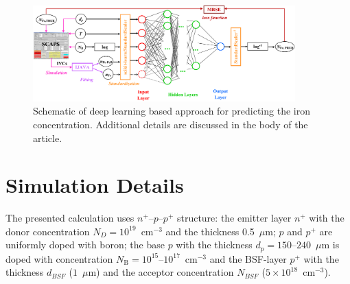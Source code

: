 \documentclass[a4paper,fleqn]{cas-sc}
\begin{document}
\begin{figure}
\centering
\includegraphics[width=0.9\textwidth]{Chem}
\caption{Schematic of deep learning based approach  for predicting the iron concentration.
Additional details are discussed in the body of the article.}
\label{fig_chem}
\end{figure}


\section{Simulation Details}

The presented calculation uses $n^+$--$p$--$p^+$ structure:
the emitter layer $n^+$ with the donor concentration $N_D=10^{19}$~cm$^{-3}$ and
the thickness 0.5~$\mu$m;
$p$ and $p^+$ are uniformly doped with boron;
the base $p$ with the thickness $d_p=150$--$240$~$\mu$m is doped with concentration
$N_\mathrm{B}=10^{15}$--$10^{17}$~cm$^{-3}$
and the BSF-layer $p^+$ with the thickness $d_{BSF}$ ($1$~$\mu$m) and the acceptor
concentration $N_{BSF}$ ($5\times10^{18}$~cm$^{-3}$).
\end{document}

